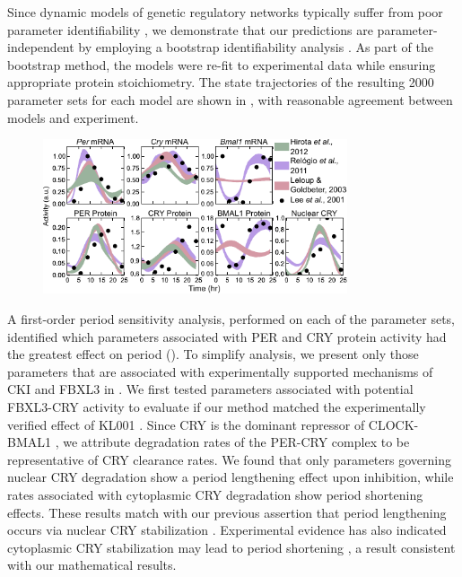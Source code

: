 Since dynamic models of genetic regulatory networks typically suffer from poor parameter identifiability \cite{Gunawan2006}, we demonstrate that our predictions are parameter-independent by employing a bootstrap identifiability analysis \cite{St.John2013}. 
As part of the bootstrap method, the models were re-fit to experimental data \cite{Lee2001} while ensuring appropriate protein stoichiometry. 
The state trajectories of the resulting 2000 parameter sets for each model are shown in , with reasonable agreement between models and experiment.

\begin{figure}[h]
  \centering
  \includegraphics[width=0.8\textwidth]{chap4/figures/fig2.pdf}
  \label{fig:4.2}
\end{figure}


A first-order period sensitivity analysis, performed on each of the parameter sets, identified which parameters associated with PER and CRY protein activity had the greatest effect on period (). 
To simplify analysis, we present only those parameters that are associated with experimentally supported mechanisms of CKI and FBXL3 in . 
We first tested parameters associated with potential FBXL3-CRY activity to evaluate if our method matched the experimentally verified effect of KL001 \cite{Hirota2012}. 
Since CRY is the dominant repressor of CLOCK-BMAL1 \cite{Ye2011}, we attribute degradation rates of the PER-CRY complex to be representative of CRY clearance rates. 
We found that only parameters governing nuclear CRY degradation show a period lengthening effect upon inhibition, while rates associated with cytoplasmic CRY degradation show period shortening effects. 
These results match with our previous assertion that period lengthening occurs via nuclear CRY stabilization \cite{Hirota2012}. 
Experimental evidence has also indicated cytoplasmic CRY stabilization may lead to period shortening \cite{Kurabayashi2010}, a result consistent with our mathematical results.

